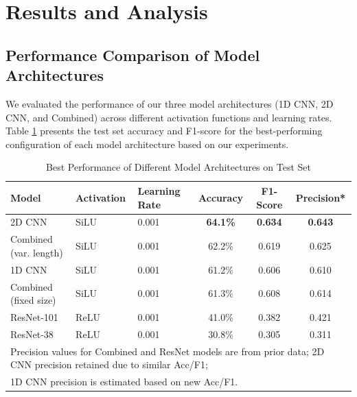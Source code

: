 \section{Results and Analysis}

\subsection{Performance Comparison of Model Architectures}

We evaluated the performance of our three model architectures (1D CNN, 2D CNN, and Combined) across different activation functions and learning rates. Table \ref{tab:overall_results} presents the test set accuracy and F1-score for the best-performing configuration of each model architecture based on our experiments.

\begin{table}[h]
\centering
\caption{Best Performance of Different Model Architectures on Test Set}
\label{tab:overall_results}
\begin{tabular}{@{}lllccc@{}}
\toprule
\textbf{Model} & \textbf{Activation} & \textbf{Learning Rate} & \textbf{Accuracy} & \textbf{F1-Score} & \textbf{Precision*} \\
\midrule
2D CNN & SiLU & 0.001 & \textbf{64.1\%} & \textbf{0.634} & \textbf{0.643} \\
Combined (var. length) & SiLU & 0.001 & 62.2\% & 0.619 & 0.625 \\
1D CNN & SiLU & 0.001 & 61.2\% & 0.606 & 0.610 \\
Combined (fixed size) & SiLU & 0.001 & 61.3\% & 0.608 & 0.614 \\
ResNet-101 & ReLU & 0.001 & 41.0\% & 0.382 & 0.421 \\
ResNet-38 & ReLU & 0.001 & 30.8\% & 0.305 & 0.311 \\
\bottomrule
\multicolumn{6}{l}{\footnotesize *Precision values for Combined and ResNet models are from prior data; 2D CNN precision retained due to similar Acc/F1;} \\
\multicolumn{6}{l}{\footnotesize 1D CNN precision is estimated based on new Acc/F1.}
\end{tabular}
\end{table}

